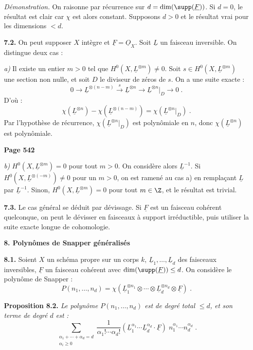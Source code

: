 \textit{D\'emonstration.} On raisonne par r\'ecurrence sur $d = \dim(\supp(\underline{F}))$. Si $d = 0$, le r\'esultat est clair car $\chi$ est alors constant. Supposons $d > 0$ et le r\'esultat vrai pour les dimensions $< d$.

\smallskip
\noindent\textbf{7.2.} On peut supposer $X$ int\`egre et $\underline{F} = \underline{O}_X$. Soit $\underline{L}$ un faisceau inversible. On distingue deux cas :

\textit{a)} Il existe un entier $m > 0$ tel que $H^0(X, \underline{L}^{\otimes m}) \neq 0$. Soit $s \in H^0(X, \underline{L}^{\otimes m})$ une section non nulle, et soit $D$ le diviseur de z\'eros de $s$. On a une suite exacte :
\[
0 \longrightarrow \underline{L}^{\otimes (n-m)} \xrightarrow{\;s\;} \underline{L}^{\otimes n} \longrightarrow \underline{L}^{\otimes n}|_D \longrightarrow 0\;.
\]
D'o\`u :
\[
\chi(\underline{L}^{\otimes n}) - \chi(\underline{L}^{\otimes (n-m)}) = \chi(\underline{L}^{\otimes n}|_D)\;.
\]
Par l'hypoth\`ese de r\'ecurrence, $\chi(\underline{L}^{\otimes n}|_D)$ est polyn\^omiale en $n$, donc $\chi(\underline{L}^{\otimes n})$ est polyn\^omiale.

\newpage
\noindent\textbf{Page 542}

\textit{b)} $H^0(X, \underline{L}^{\otimes m}) = 0$ pour tout $m > 0$. On consid\`ere alors $\underline{L}^{-1}$. Si $H^0(X, \underline{L}^{\otimes (-m)}) \neq 0$ pour un $m > 0$, on est ramen\'e au cas a) en rempla\c{c}ant $\underline{L}$ par $\underline{L}^{-1}$. Sinon, $H^0(X, \underline{L}^{\otimes m}) = 0$ pour tout $m \in \Z$, et le r\'esultat est trivial.

\smallskip
\noindent\textbf{7.3.} Le cas g\'en\'eral se d\'eduit par d\'evissage. Si $\underline{F}$ est un faisceau coh\'erent quelconque, on peut le d\'evisser en faisceaux \`a support irr\'eductible, puis utiliser la suite exacte longue de cohomologie.

\medskip
\noindent\textbf{8. Polyn\^omes de Snapper g\'en\'eralis\'es}

\smallskip
\noindent\textbf{8.1.} Soient $X$ un sch\'ema propre sur un corps $k$, $\underline{L}_1, \ldots, \underline{L}_d$ des faisceaux inversibles, $\underline{F}$ un faisceau coh\'erent avec $\dim(\supp(\underline{F})) \leq d$. On consid\`ere le polyn\^ome de Snapper :
\[
P(n_1, \ldots, n_d) = \chi(\underline{L}_1^{\otimes n_1} \otimes \cdots \otimes \underline{L}_d^{\otimes n_d} \otimes \underline{F})\;.
\]

\smallskip
\noindent\textbf{Proposition 8.2.} \textit{Le polyn\^ome $P(n_1, \ldots, n_d)$ est de degr\'e total $\leq d$, et son terme de degr\'e $d$ est :
\[
\sum_{\substack{\alpha_1 + \cdots + \alpha_d = d\\\alpha_i \geq 0}} \frac{1}{\alpha_1! \cdots \alpha_d!} (\underline{L}_1^{\alpha_1} \cdots \underline{L}_d^{\alpha_d} \cdot \underline{F}) \; n_1^{\alpha_1} \cdots n_d^{\alpha_d}\;.
\]}

